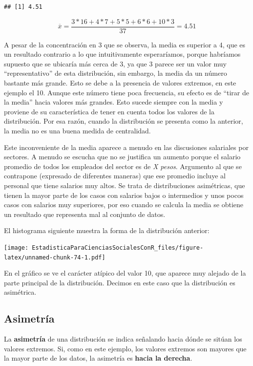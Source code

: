 \documentclass[]{book}
\begin{document}
\begin{verbatim}
## [1] 4.51
\end{verbatim}

\[\overline{x} = \frac{3*16 + 4*7 + 5*5 + 6*6 + 10*3}{37} = 4.51\]

A pesar de la concentración en 3 que se observa, la media es superior a 4, que es un resultado contrario a lo que intuitivamente esperaríamos,
porque habríamos supuesto que se ubicaría más cerca de 3, ya que 3
parece ser un valor muy ``representativo'' de esta distribución, sin
embargo, la media da un número bastante más grande. Esto se debe a la
presencia de valores extremos, en este ejemplo el 10. Aunque este número
tiene poca frecuencia, su efecto es de ``tirar de la media'' hacia valores
más grandes. Esto sucede siempre con la media y proviene de su
característica de tener en cuenta todos los valores de la distribución.
Por esa razón, cuando la distribución se presenta como la anterior, la
media no es una buena medida de centralidad.

Este inconveniente de la media aparece a menudo en las discusiones
salariales por sectores. A menudo se escucha que no se justifica un
aumento porque el salario promedio de todos los empleados del sector es
de \emph{X pesos}. Argumento al que se contrapone (expresado de diferentes
maneras) que ese promedio incluye al personal que tiene salarios muy
altos. Se trata de distribuciones asimétricas, que tienen la mayor parte
de los casos con salarios bajos o intermedios y unos pocos casos con
salarios muy superiores, por eso cuando se calcula la media se obtiene
un resultado que representa mal al conjunto de datos.

El histograma siguiente muestra la forma de la distribución anterior:

\texttt{[image: EstadisticaParaCienciasSocialesConR\_files/figure-latex/unnamed-chunk-74-1.pdf]}

En el gráfico se ve el carácter atípico del valor 10, que aparece muy
alejado de la parte principal de la distribución. Decimos en este caso
que la distribución es asimétrica.

\hypertarget{asimetria}{%
\subsection{Asimetría}\label{asimetria}}

La \textbf{asimetría} de una distribución se indica señalando hacia dónde se
sitúan los valores extremos. Si, como en este ejemplo, los valores
extremos son mayores que la mayor parte de los datos, la asimetría es
\textbf{hacia la derecha}.
\end{document}
